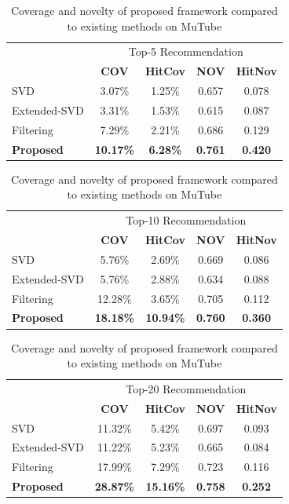 \documentclass[a4paper,12pt]{report}
\begin{document}
\begin{table}[!htb]
    \centering
    \caption{Coverage and novelty of proposed framework compared to existing methods on MuTube}
    \begin{tabular}{|l ||c c| c c |}
    \hline
        & \multicolumn{4}{c|}{Top-5 Recommendation} \\
    \cline{2-5}
        &  \textbf{COV} & \textbf{HitCov} & \textbf{NOV} & \textbf{HitNov} \\
    \hline
     SVD               &  3.07\%  & 1.25\% & 0.657 & 0.078 \\
     Extended-SVD      &  3.31\%  & 1.53\% & 0.615 & 0.087 \\ 
     Filtering         &  7.29\%  & 2.21\% & 0.686 & 0.129  \\
     \textbf{Proposed} &  \textbf{10.17\%} & \textbf{6.28\%} & \textbf{0.761} & \textbf{0.420}  \\
     \hline
    \end{tabular}
    \bigskip
    
    \begin{tabular}{|l ||c c| c c |}
    \hline
        & \multicolumn{4}{c|}{Top-10 Recommendation} \\
    \cline{2-5}
        &  \textbf{COV} & \textbf{HitCov} & \textbf{NOV} & \textbf{HitNov} \\
    \hline
     SVD               &  5.76\%  & 2.69\% & 0.669 & 0.086 \\
     Extended-SVD      &  5.76\%  & 2.88\% & 0.634 & 0.088 \\ 
     Filtering         &  12.28\%  & 3.65\% & 0.705 & 0.112  \\
     \textbf{Proposed} &  \textbf{18.18\%} & \textbf{10.94\%} & \textbf{0.760} & \textbf{0.360}  \\
     \hline
    \end{tabular}
    \bigskip
    
    \begin{tabular}{|l ||c c| c c |}
    \hline
        & \multicolumn{4}{c|}{Top-20 Recommendation} \\
    \cline{2-5}
        &  \textbf{COV} & \textbf{HitCov} & \textbf{NOV} & \textbf{HitNov} \\
    \hline
     SVD               &  11.32\%  & 5.42\% & 0.697 & 0.093 \\
     Extended-SVD      &  11.22\%  & 5.23\% & 0.665 & 0.084 \\ 
     Filtering         &  17.99\%  & 7.29\% & 0.723 & 0.116  \\
     \textbf{Proposed} &  \textbf{28.87\%} & \textbf{15.16\%} & \textbf{0.758} & \textbf{0.252}  \\
     \hline
    \end{tabular}
    \label{tab:MuTube_cov&nov}
\end{table}
\end{document}
